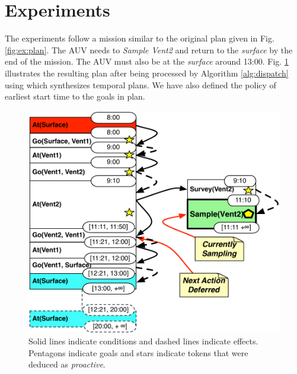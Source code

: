 \section{Experiments}
\label{sec:exp}

The experiments follow a mission similar to the original plan given in
Fig. \ref{fig:ex:plan}. The AUV needs to {\em Sample Vent2} and return
to the {\em surface} by the end of the mission. The AUV must also be
at the {\em surface} around 13:00. Fig. \ref{fig:ex:mixed1}
illustrates the resulting plan after being processed by Algorithm
\ref{alg:dispatch} using \rx which synthesizes temporal plans. We have
also defined the policy of earliest start time to the goals in plan.

\begin{figure}[!b]
  \centering
  \vskip-2mm
  \includegraphics[width=0.9\columnwidth]{figs/example_MixedInitial}
  \vskip-2mm
  \caption{\small Solid lines indicate conditions and dashed lines
    indicate effects. Pentagons indicate goals and stars
    indicate tokens that were deduced as {\em proactive}.}
  \label{fig:ex:mixed1}
  \vskip-3mm
\end{figure}



